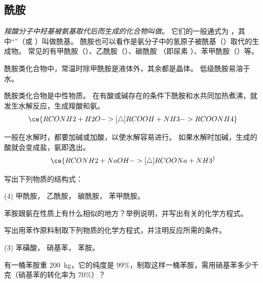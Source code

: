 \subsection{酰胺}
\emph{羧酸分子中羟基被氨基取代后而生成的化合物叫做}。
它们的一般通式为 ，其中“”（或 ）叫做酰基。
酰胺也可以看作是氨分子中的氢原子被酰基（）取代的生成物。
常见的有甲酰胺（）、乙酰胺（）、碳酰胺 （即尿素 ）、苯甲酰胺（）等。

酰胺类化合物中，常温时除甲酰胺是液体外，其余都是晶体。
低级酰胺易溶于水。

酰胺类化合物是中性物质。
在有酸或碱存在的条件下酰胺和水共同加热煮沸，就发生水解反应，生成羧酸和氨。
\[ \ce{ RCONH2 + H2O ->[\triangle] RCOOH + NH3 -> RCOONH4 } \]

一般在水解时，都要加碱或加酸，以使水解容易进行。
如果水解时加碱，生成的酸就会变成盐，氨即逸出。
\[ \ce{ RCONH2 + NaOH ->[\triangle] RCOONa + NH3 ^ } \]

\begin{Practice}[习题]
\begin{question}
  \item 写出下列物质的结构式：
  \begin{tasks}(4)
    \task 甲酰胺，
    \task 乙酰胺，
    \task 碳酰胺，
    \task 苯甲酰胺。
  \end{tasks}
  \item 苯胺跟氨在性质上有什么相似的地方？举例说明，并写出有关的化学方程式。
  \item 写出用苯作原料制取下列物质的化学方程式，并注明反应所需的条件。
  \begin{tasks}(3)
    \task 苯磺酸，
    \task 硝基苯，
    \task 苯胺。
  \end{tasks}
  \item 有一桶苯胺重 \qty{200}{kg}，它的纯度是 99\%，制取这样一桶苯胺，需用硝基苯多少千克（硝基苯的转化率为 70\%）？
\end{question}
\end{Practice}

